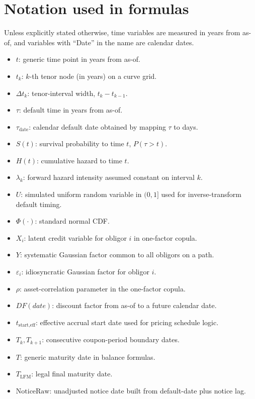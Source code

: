 \documentclass[11pt]{article}
\begin{document}
\section*{Notation used in formulas}
Unless explicitly stated otherwise, time variables are measured in years from as-of, and variables with ``Date'' in the name are calendar dates.
\begin{itemize}
  \item \(t\): generic time point in years from as-of.
  \item \(t_k\): \(k\)-th tenor node (in years) on a curve grid.
  \item \(\Delta t_k\): tenor-interval width, \(t_k-t_{k-1}\).
  \item \(\tau\): default time in years from as-of.
  \item \(\tau_{\text{date}}\): calendar default date obtained by mapping \(\tau\) to days.
  \item \(S(t)\): survival probability to time \(t\), \(P(\tau>t)\).
  \item \(H(t)\): cumulative hazard to time \(t\).
  \item \(\lambda_k\): forward hazard intensity assumed constant on interval \(k\).
  \item \(U\): simulated uniform random variable in \((0,1]\) used for inverse-transform default timing.
  \item \(\Phi(\cdot)\): standard normal CDF.
  \item \(X_i\): latent credit variable for obligor \(i\) in one-factor copula.
  \item \(Y\): systematic Gaussian factor common to all obligors on a path.
  \item \(\varepsilon_i\): idiosyncratic Gaussian factor for obligor \(i\).
  \item \(\rho\): asset-correlation parameter in the one-factor copula.
  \item \(DF(date)\): discount factor from as-of to a future calendar date.
  \item \(t_{\text{start,eff}}\): effective accrual start date used for pricing schedule logic.
  \item \(T_k, T_{k+1}\): consecutive coupon-period boundary dates.
  \item \(T\): generic maturity date in balance formulas.
  \item \(T_{\text{LFM}}\): legal final maturity date.
  \item \(\text{NoticeRaw}\): unadjusted notice date built from default-date plus notice lag.

\end{itemize}
\end{document}
